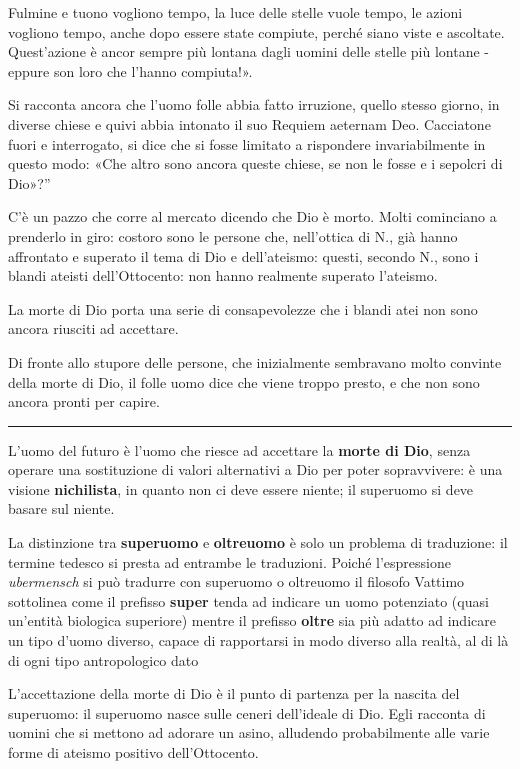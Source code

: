 \documentclass[a4paper, twoside, titlepage]{book}
\begin{document}
{Fulmine e tuono vogliono tempo, la luce delle stelle vuole tempo, le azioni vogliono tempo, anche dopo essere state compiute, perché siano viste e ascoltate. Quest’azione è ancor sempre più lontana dagli uomini delle stelle più lontane - eppure son loro che l’hanno compiuta!».

Si racconta ancora che l’uomo folle abbia fatto irruzione, quello stesso giorno, in diverse chiese e quivi abbia intonato il suo Requiem aeternam Deo. Cacciatone fuori e interrogato, si dice che si fosse limitato a rispondere invariabilmente in questo modo: «Che altro sono ancora queste chiese, se non le fosse e i sepolcri di Dio»?”}

C'è un pazzo che corre al mercato dicendo che Dio è morto. Molti cominciano a prenderlo in giro: costoro sono le persone che, nell'ottica di N., già hanno affrontato e superato il tema di Dio e dell'ateismo: questi, secondo N., sono i blandi ateisti dell'Ottocento: non hanno realmente superato l'ateismo.

La morte di Dio porta una serie di consapevolezze che i blandi atei non sono ancora riusciti ad accettare.

Di fronte allo stupore delle persone, che inizialmente sembravano molto convinte della morte di Dio, il folle uomo dice che viene troppo presto, e che non sono ancora pronti per capire.

\medskip\hrule\medskip

L'uomo del futuro è l'uomo che riesce ad accettare la \textbf{morte di Dio}, senza operare una sostituzione di valori alternativi a Dio per poter sopravvivere: è una visione \textbf{nichilista}, in quanto non ci deve essere niente; il superuomo si deve basare sul niente.

La distinzione tra \textbf{superuomo} e \textbf{oltreuomo} è solo un problema di traduzione: il termine tedesco si presta ad entrambe le traduzioni. Poiché l’espressione \textit{ubermensch} si può tradurre con superuomo o oltreuomo il filosofo Vattimo sottolinea come il prefisso \textbf{super} tenda ad indicare un uomo potenziato (quasi un’entità biologica superiore) mentre il prefisso \textbf{oltre} sia più adatto ad indicare un tipo d’uomo diverso, capace di rapportarsi in modo diverso alla realtà, al di là di ogni tipo antropologico dato

L'accettazione della morte di Dio è il punto di partenza per la nascita del superuomo: il superuomo nasce sulle ceneri dell'ideale di Dio. Egli racconta di uomini che si mettono ad adorare un asino, alludendo probabilmente alle varie forme di ateismo positivo dell'Ottocento.
\end{document}
